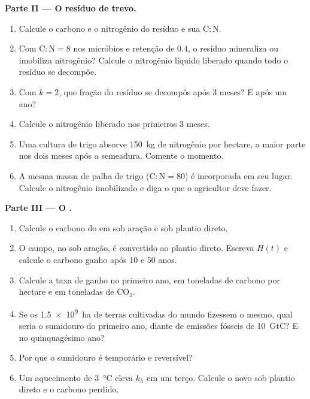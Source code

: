 \begin{problem}
\medskip
\noindent\textbf{Parte II --- O resíduo de trevo.}
\begin{enumerate}[resume]
  \item Calcule o carbono e o nitrogênio do resíduo e sua
        $\mathrm{C:N}$.
  \item Com $\mathrm{C:N} = 8$ nos micróbios e retenção de $0.4$, o
        resíduo mineraliza ou imobiliza nitrogênio? Calcule o
        nitrogênio líquido liberado quando todo o resíduo se decompõe.
  \item Com $k = 2$, que fração do resíduo se decompôs após
        3 meses? E após um ano?
  \item Calcule o nitrogênio liberado nos primeiros 3 meses.
  \item Uma cultura de trigo absorve \qty{150}{kg} de nitrogênio por hectare,
        a maior parte nos dois meses após a semeadura. Comente o
        momento.
  \item A mesma massa de palha de trigo ($\mathrm{C:N} = 80$) é
        incorporada em seu lugar. Calcule o nitrogênio imobilizado e
        diga o que o agricultor deve fazer.
\end{enumerate}

\medskip
\noindent\textbf{Parte III --- O .}
\begin{enumerate}[resume]
  \item Calcule o carbono do  em  sob aração e
        sob plantio direto.
  \item O campo, no  sob aração, é convertido ao
        plantio direto. Escreva $H(t)$ e calcule o carbono ganho após
        10 e 50 anos.
  \item Calcule a taxa de ganho no primeiro ano, em toneladas de
        carbono por hectare e em toneladas de $\mathrm{CO_2}$.
  \item Se os \qty{1.5e9}{ha} de terras cultivadas do mundo fizessem o
        mesmo, qual seria o sumidouro do primeiro ano, diante de emissões
        fósseis de \qty{10}{GtC}? E no quinquagésimo ano?
  \item Por que o sumidouro é temporário e reversível?
  \item Um aquecimento de \qty{3}{\celsius} eleva $k_h$ em um terço.
        Calcule o novo  sob plantio direto e o carbono perdido.
\end{enumerate}


\end{problem}
